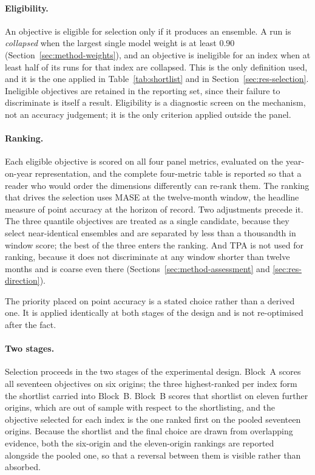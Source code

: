 \documentclass[12pt]{article}
\begin{document}
\paragraph{Eligibility.}
An objective is eligible for selection only if it produces an ensemble. A run
is \emph{collapsed} when the largest single model weight is at least $0.90$
(Section~\ref{sec:method-weights}), and an objective is ineligible for an index
when at least half of its runs for that index are collapsed. This is the only
definition used, and it is the one applied in Table~\ref{tab:shortlist} and in
Section~\ref{sec:res-selection}. Ineligible objectives are retained in the
reporting set, since their failure to discriminate is itself a result. Eligibility is a
diagnostic screen on the mechanism, not an accuracy judgement; it is the only
criterion applied outside the panel.

\paragraph{Ranking.}
Each eligible objective is scored on all four panel metrics, evaluated on the
year-on-year representation, and the complete four-metric table is reported so
that a reader who would order the dimensions differently can re-rank them. The
ranking that drives the selection uses MASE at the twelve-month window, the
headline measure of point accuracy at the horizon of record. Two adjustments
precede it. The three quantile objectives are treated as a single candidate,
because they select near-identical ensembles and are separated by less than a
thousandth in window score; the best of the three enters the ranking. And TPA
is not used for ranking, because it does not discriminate at any window shorter
than twelve months and is coarse even there
(Sections~\ref{sec:method-assessment} and \ref{sec:res-direction}).

The priority placed on point accuracy is a stated choice rather than a derived
one. It is applied identically at both stages of the design and is not
re-optimised after the fact.

\paragraph{Two stages.}
Selection proceeds in the two stages of the experimental design. Block~A scores
all seventeen objectives on six origins; the three highest-ranked per index form
the shortlist carried into Block~B. Block~B scores that shortlist on eleven
further origins, which are out of sample with respect to the shortlisting, and
the objective selected for each index is the one ranked first on the pooled
seventeen origins. Because the shortlist and the final choice are drawn from
overlapping evidence, both the six-origin and the eleven-origin rankings are
reported alongside the pooled one, so that a reversal between them is visible
rather than absorbed.
\end{document}
